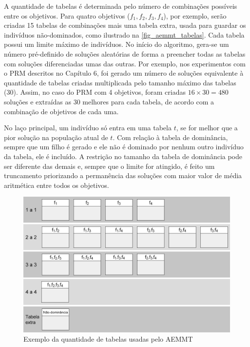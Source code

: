 A quantidade de tabelas é determinada pelo número de combinações possíveis entre os objetivos. Para quatro objetivos ($f_1, f_2, f_3, f_4$), por exemplo, serão criadas 15 tabelas de combinações mais uma tabela extra, usada para guardar os indivíduos não-dominados, como ilustrado na \autoref{fig_aemmt_tabelas}. Cada tabela possui um limite máximo de indivíduos. No início do algoritmo, gera-se um número pré-definido de soluções aleatórias de forma a preencher todas as tabelas com soluções diferenciadas umas das outras. Por exemplo, nos experimentos com o PRM descritos no Capítulo 6, foi gerado um número de soluções equivalente à quantidade de tabelas criadas multiplicada pelo tamanho máximo das tabelas (30). Assim, no caso do PRM com 4 objetivos, foram criadas $16 \times 30 = 480$ soluções e extraídas as 30 melhores para cada tabela, de acordo com a combinação de objetivos de cada uma.

No laço principal, um indivíduo só entra em uma tabela $t$, se for melhor que a pior solução na população atual de $t$. Com relação à tabela de dominância, sempre que um filho é gerado e ele não é dominado por nenhum outro indivíduo da tabela, ele é incluído. A restrição no tamanho da tabela de dominância pode ser diferente das demais e, sempre que o limite for atingido, é feito um truncamento priorizando a permanência das soluções com maior valor de média aritmética entre todos os objetivos.

\begin{figure}[!htbp]
	\centering
	\includegraphics[width=1\textwidth]{cap_otimizacao-multi/figs/aeemt-tabelas}
	\caption{\label{fig_aemmt_tabelas}Exemplo da quantidade de tabelas usadas pelo AEMMT}
\end{figure}

